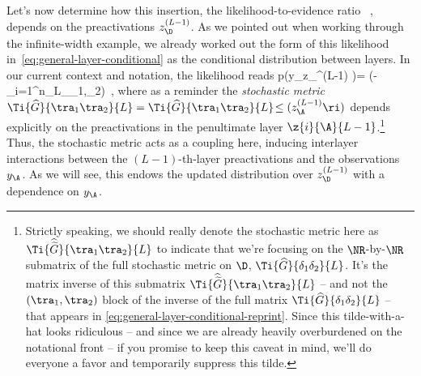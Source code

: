 Let's now determine how this insertion, the likelihood-to-evidence ratio 
\be\label{eq:likelihood-to-evidence-ratio}
\, ,
\ee 
depends on the preactivations $z^{(L-1)}_{\D}$. As we pointed out when working through the infinite-width example, we already worked out the form of this likelihood in~\eqref{eq:general-layer-conditional} as the conditional distribution between layers. In our current context and notation, the likelihood reads
\be\label{eq:general-layer-conditional-reprint}
p\!\le(y_\A \Big\vert z_{\D}^{(L-1)} \ri)=  \exp\!\le(-\sum_{i=1}^{n_{L}}\sum_{\tra_1,\tra_2\in\A}\ri)\, ,
\ee
where as a reminder the \emph{stochastic metric} $\Ti{\widehat{G}}{\tra_1 \tra_2}{L}= \Ti{\widehat{G}}{\tra_1 \tra_2}{L}\!\le( z_{\A}^{(L-1)}\ri)$ depends explicitly on the preactivations in the penultimate layer $\z{i}{\A}{L-1}$.\footnote{
    \label{foot:gross-tilde-hat}Strictly speaking, we should really denote the stochastic metric here as $\Ti{\widehat{\widetilde{G}}}{\tra_1 \tra_2}{L}$ to indicate that we're focusing on the $\NR$-by-$\NR$ submatrix of the full stochastic metric on $\D$, $\Ti{\widehat{G}}{\delta_1 \delta_2}{L}$. It's the matrix inverse of this submatrix $\Ti{\widehat{\widetilde{G}}}{\tra_1 \tra_2}{L}$ -- and not the $(\tra_1, \tra_2)$ block of the inverse of the full matrix $\Ti{\widehat{G}}{\delta_1 \delta_2}{L}$ -- that appears in \eqref{eq:general-layer-conditional-reprint}.
    Since  this tilde-with-a-hat looks ridiculous -- and since we are already heavily overburdened on the notational front -- if you promise to keep this caveat in mind, we'll do everyone a favor and temporarily suppress this tilde.
} 
Thus, the stochastic metric acts as a coupling here, inducing interlayer interactions between the $(L-1)$-th-layer preactivations and the observations $y_\A$. As we will see, this endows the updated distribution over $z_{\D}^{(L-1)}$ with a dependence on $y_\A$. 







